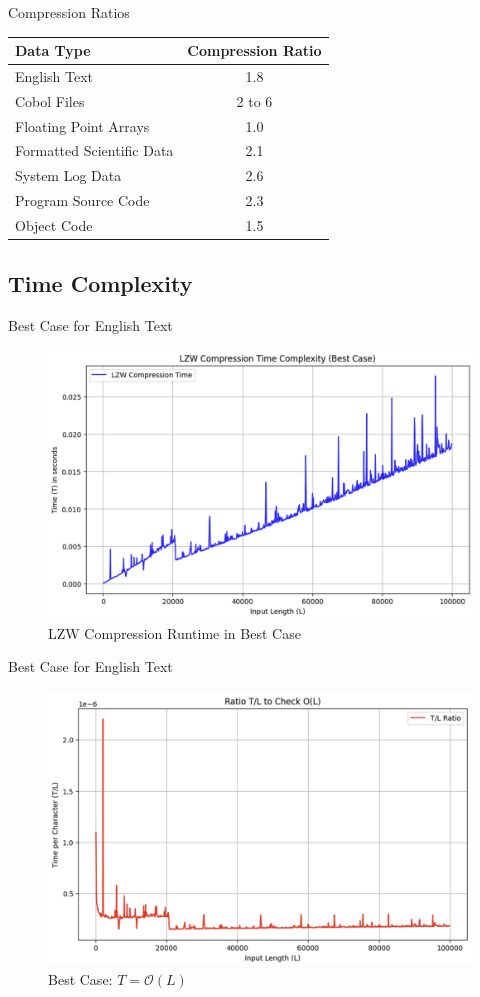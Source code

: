 \documentclass[10pt,handout,english]{beamer}
\begin{document}
\begin{frame}{Compression Ratios}
    \begin{table}[h!]
    \centering
    \begin{tabular}{|l|c|}
    \hline
    \textbf{Data Type}               & \textbf{Compression Ratio} \\ \hline
    English Text                     & 1.8                        \\ \hline
    Cobol Files                      & 2 to 6                     \\ \hline
    Floating Point Arrays            & 1.0                        \\ \hline
    Formatted Scientific Data        & 2.1                        \\ \hline
    System Log Data                  & 2.6                        \\ \hline
    Program Source Code              & 2.3                        \\ \hline
    Object Code                      & 1.5                        \\ \hline
    \end{tabular}
    \label{tab:compression_results}
    \end{table}
\end{frame}

\subsection{Time Complexity}

\begin{frame}{Best Case for English Text}
    \begin{figure}[ht]
    \centering
    \includegraphics[width=0.5\linewidth]{pic/best_case.png}
    \caption{LZW Compression Runtime in Best Case}
    \label{fig:bestcase}
    \end{figure}
\end{frame}

\begin{frame}{Best Case for English Text}
    \begin{figure}[ht]
    \centering
    \includegraphics[width=0.5\linewidth]{pic/bestcase_prove.png}
    \caption{Best Case: $T = \mathcal{O}(L)$}
\end{figure}
\end{frame}
\end{document}
